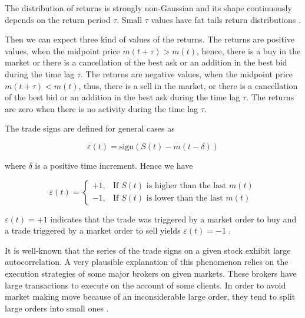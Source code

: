 The distribution of returns is strongly non-Gaussian and its shape continuously
depends on the return period $\tau$. Small $\tau$ values have fat tails return
distributions \cite{subtle_nature}.

Then we can expect three kind of values of the returns. The returns are
positive values, when the midpoint price
$m\left(t+\tau\right) > m\left(t\right)$, hence, there is a buy in the market
or there is a cancellation of the best ask or an addition in the best bid
during the time lag $\tau$. The returns are negative values, when the midpoint
price $m\left(t+\tau\right) < m\left(t\right)$, thus, there is a sell in the
market, or there is a cancellation of the best bid or an addition in the best
ask during the time lag $\tau$. The returns are zero when there is no activity
during the time lag $\tau$.

The trade signs are defined for general cases as

\begin{equation}\label{eq:trade_sign_general}
    \varepsilon\left(t\right)=\text{sign}\left(S\left(t\right)
    -m\left(t-\delta\right)\right)
\end{equation}

where $\delta$ is a positive time increment. Hence we have

\begin{equation}\label{eq:trade_sign_results}
    \varepsilon\left(t\right)=\left\{
    \begin{array}{cc}
    +1, & \text{If } S\left(t\right)
    \text{ is higher than the last } m\left( t \right)\\
    -1, & \text{If } S\left(t\right)
    \text{ is lower than the last } m\left( t \right)
    \end{array}\right.
\end{equation}

$\varepsilon(t) = +1$ indicates that the trade was triggered by a market order
to buy and a trade triggered by a market order to sell yields
$\varepsilon(t) = -1$
\cite{subtle_nature,Bouchaud_2004,spread_changes_affect,quant_stock_price_response,order_flow_persistent}.

It is well-known that the series of the trade signs on a given stock exhibit
large autocorrelation. A very plausible explanation of this phenomenon relies
on the execution strategies of some major brokers on given markets. These
brokers have large transactions to execute on the account of some clients. In
order to avoid market making move because of an inconsiderable large order,
they tend to split large orders into small ones \cite{empirical_facts}.

